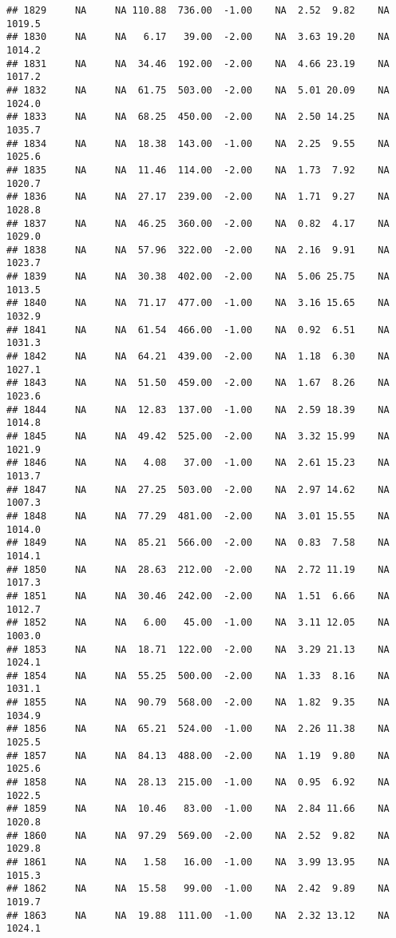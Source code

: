 \documentclass{article}\usepackage{graphicx, color}
\makeatletter
\newenvironment{kframe}{%
 \def\at@end@of@kframe{}%
 \ifinner\ifhmode%
  \def\at@end@of@kframe{\end{minipage}}%
  \begin{minipage}{\columnwidth}%
 \fi\fi%
 \def\FrameCommand##1{\hskip\@totalleftmargin \hskip-\fboxsep
 \colorbox{shadecolor}{##1}\hskip-\fboxsep
     \hskip-\linewidth \hskip-\@totalleftmargin \hskip\columnwidth}%
 \MakeFramed {\advance\hsize-\width
   \@totalleftmargin\z@ \linewidth\hsize
   \@setminipage}}%
 {\par\unskip\endMakeFramed%
 \at@end@of@kframe}
\newenvironment{knitrout}{}{} %
\makeatother
\begin{document}
\begin{knitrout}
\begin{kframe}
\begin{verbatim}
## 1829     NA     NA 110.88  736.00  -1.00    NA  2.52  9.82    NA 1019.5
## 1830     NA     NA   6.17   39.00  -2.00    NA  3.63 19.20    NA 1014.2
## 1831     NA     NA  34.46  192.00  -2.00    NA  4.66 23.19    NA 1017.2
## 1832     NA     NA  61.75  503.00  -2.00    NA  5.01 20.09    NA 1024.0
## 1833     NA     NA  68.25  450.00  -2.00    NA  2.50 14.25    NA 1035.7
## 1834     NA     NA  18.38  143.00  -1.00    NA  2.25  9.55    NA 1025.6
## 1835     NA     NA  11.46  114.00  -2.00    NA  1.73  7.92    NA 1020.7
## 1836     NA     NA  27.17  239.00  -2.00    NA  1.71  9.27    NA 1028.8
## 1837     NA     NA  46.25  360.00  -2.00    NA  0.82  4.17    NA 1029.0
## 1838     NA     NA  57.96  322.00  -2.00    NA  2.16  9.91    NA 1023.7
## 1839     NA     NA  30.38  402.00  -2.00    NA  5.06 25.75    NA 1013.5
## 1840     NA     NA  71.17  477.00  -1.00    NA  3.16 15.65    NA 1032.9
## 1841     NA     NA  61.54  466.00  -1.00    NA  0.92  6.51    NA 1031.3
## 1842     NA     NA  64.21  439.00  -2.00    NA  1.18  6.30    NA 1027.1
## 1843     NA     NA  51.50  459.00  -2.00    NA  1.67  8.26    NA 1023.6
## 1844     NA     NA  12.83  137.00  -1.00    NA  2.59 18.39    NA 1014.8
## 1845     NA     NA  49.42  525.00  -2.00    NA  3.32 15.99    NA 1021.9
## 1846     NA     NA   4.08   37.00  -1.00    NA  2.61 15.23    NA 1013.7
## 1847     NA     NA  27.25  503.00  -2.00    NA  2.97 14.62    NA 1007.3
## 1848     NA     NA  77.29  481.00  -2.00    NA  3.01 15.55    NA 1014.0
## 1849     NA     NA  85.21  566.00  -2.00    NA  0.83  7.58    NA 1014.1
## 1850     NA     NA  28.63  212.00  -2.00    NA  2.72 11.19    NA 1017.3
## 1851     NA     NA  30.46  242.00  -2.00    NA  1.51  6.66    NA 1012.7
## 1852     NA     NA   6.00   45.00  -1.00    NA  3.11 12.05    NA 1003.0
## 1853     NA     NA  18.71  122.00  -2.00    NA  3.29 21.13    NA 1024.1
## 1854     NA     NA  55.25  500.00  -2.00    NA  1.33  8.16    NA 1031.1
## 1855     NA     NA  90.79  568.00  -2.00    NA  1.82  9.35    NA 1034.9
## 1856     NA     NA  65.21  524.00  -1.00    NA  2.26 11.38    NA 1025.5
## 1857     NA     NA  84.13  488.00  -2.00    NA  1.19  9.80    NA 1025.6
## 1858     NA     NA  28.13  215.00  -1.00    NA  0.95  6.92    NA 1022.5
## 1859     NA     NA  10.46   83.00  -1.00    NA  2.84 11.66    NA 1020.8
## 1860     NA     NA  97.29  569.00  -2.00    NA  2.52  9.82    NA 1029.8
## 1861     NA     NA   1.58   16.00  -1.00    NA  3.99 13.95    NA 1015.3
## 1862     NA     NA  15.58   99.00  -1.00    NA  2.42  9.89    NA 1019.7
## 1863     NA     NA  19.88  111.00  -1.00    NA  2.32 13.12    NA 1024.1

\end{verbatim}
\end{kframe}
\end{knitrout}
\end{document}
